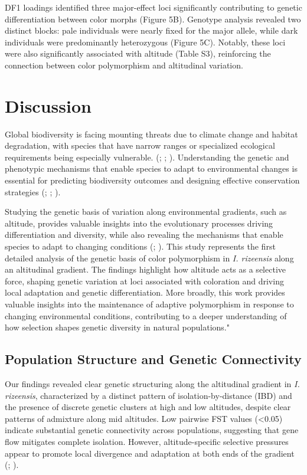 \documentclass[9pt,a4paper,twoside]{rho-class/rho}
\begin{document}
        DF1 loadings identified three major-effect loci significantly contributing to genetic differentiation between color morphs (Figure 5B). Genotype analysis revealed two distinct blocks: pale individuals were nearly fixed for the major allele, while dark individuals were predominantly heterozygous (Figure 5C). Notably, these loci were also significantly associated with altitude (Table S3), reinforcing the connection between color polymorphism and altitudinal variation.

\section{Discussion}

    Global biodiversity is facing mounting threats due to climate change and habitat degradation, with species that have narrow ranges or specialized ecological requirements being especially vulnerable. (\cite{Segan2016}; \cite{Wang2024}; \cite{Harvey2020}). Understanding the genetic and phenotypic mechanisms that enable species to adapt to environmental changes is essential for predicting biodiversity outcomes and designing effective conservation strategies (\cite{Merilä2014}; \cite{Kelly2019}; \cite{Waldvogel2020}).
    
    Studying the genetic basis of variation along environmental gradients, such as altitude, provides valuable insights into the evolutionary processes driving differentiation and diversity, while also revealing the mechanisms that enable species to adapt to changing conditions (\cite{Wogan2018}; \cite{Kelly2019}). This study represents the first detailed analysis of the genetic basis of color polymorphism in \textit{I. rizeensis} along an altitudinal gradient. The findings highlight how altitude acts as a selective force, shaping genetic variation at loci associated with coloration and driving local adaptation and genetic differentiation. More broadly, this work provides valuable insights into the maintenance of adaptive polymorphism in response to changing environmental conditions, contributing to a deeper understanding of how selection shapes genetic diversity in natural populations."
    
    \subsection{Population Structure and Genetic Connectivity}

        Our findings revealed clear genetic structuring along the altitudinal gradient in \textit{I. rizeensis}, characterized by a distinct pattern of isolation-by-distance (IBD) and the presence of discrete genetic clusters at high and low altitudes, despite clear patterns of admixture along mid altitudes. Low pairwise FST values (<0.05) indicate substantial genetic connectivity across populations, suggesting that gene flow mitigates complete isolation. However, altitude-specific selective pressures appear to promote local divergence and adaptation at both ends of the gradient (\cite{Tigano2016}; \cite{Wang2014}).
        
\end{document}
